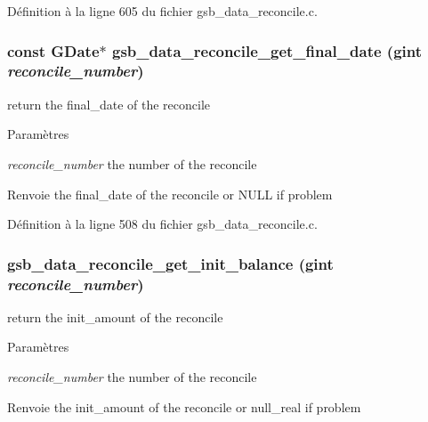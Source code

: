 Définition à la ligne 605 du fichier gsb\_\-data\_\-reconcile.c.

\subsubsection[{gsb\_\-data\_\-reconcile\_\-get\_\-final\_\-date}]{\setlength{\rightskip}{0pt plus 5cm}const GDate$\ast$ gsb\_\-data\_\-reconcile\_\-get\_\-final\_\-date (gint {\em reconcile\_\-number})}\label{gsb__data__reconcile_8h_ac2e105ad149161a371283aa75049d3b6}
return the final\_\-date of the reconcile


\begin{DoxyParams}{Paramètres}
\item[{\em reconcile\_\-number}]the number of the reconcile\end{DoxyParams}
\begin{DoxyReturn}{Renvoie}
the final\_\-date of the reconcile or NULL if problem 
\end{DoxyReturn}


Définition à la ligne 508 du fichier gsb\_\-data\_\-reconcile.c.

\subsubsection[{gsb\_\-data\_\-reconcile\_\-get\_\-init\_\-balance}]{ gsb\_\-data\_\-reconcile\_\-get\_\-init\_\-balance (gint {\em reconcile\_\-number})}\label{gsb__data__reconcile_8h_ac14e8641bb156f533d7ac2427c4b9cfc}
return the init\_\-amount of the reconcile


\begin{DoxyParams}{Paramètres}
\item[{\em reconcile\_\-number}]the number of the reconcile\end{DoxyParams}
\begin{DoxyReturn}{Renvoie}
the init\_\-amount of the reconcile or null\_\-real if problem 
\end{DoxyReturn}


